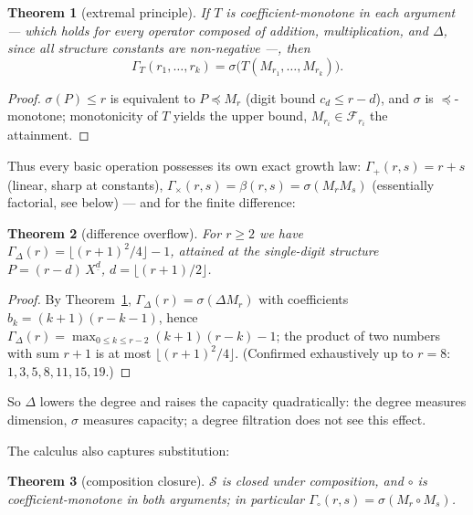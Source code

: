 \documentclass[11pt]{article}
\newtheorem{satz}{Theorem}[section]
\theoremstyle{definition}
\theoremstyle{remark}
\newcommand{\Struk}{\mathcal S}
\newcommand{\ff}[2]{#1^{\underline{#2}}}
\begin{document}
\begin{satz}[extremal principle]\label{satz:extremal}
If $T$ is coefficient-monotone in each argument --- which holds for
every operator composed of addition, multiplication, and $\Delta$,
since all structure constants are non-negative ---, then
\[
\Gamma_T(r_1,\ldots,r_k)=\sigma\bigl(T(M_{r_1},\ldots,M_{r_k})\bigr).
\]
\end{satz}

\begin{proof}
$\sigma(P)\le r$ is equivalent to $P\preceq M_r$ (digit bound
$c_d\le r-d$), and $\sigma$ is $\preceq$-monotone; monotonicity of
$T$ yields the upper bound, $M_{r_i}\in\mathcal F_{r_i}$ the
attainment.
\end{proof}

Thus every basic operation possesses its own exact growth law:
$\Gamma_+(r,s)=r+s$ (linear, sharp at constants),
$\Gamma_\times(r,s)=\beta(r,s)=\sigma(M_rM_s)$ (essentially
factorial, see below) --- and for the finite difference:

\begin{satz}[difference overflow]\label{satz:differenzueberlauf}
For $r\ge2$ we have
$\Gamma_\Delta(r)=\lfloor(r+1)^2/4\rfloor-1$, attained at the
single-digit structure $P=(r{-}d)\,\ff Xd$, $d=\lfloor(r+1)/2\rfloor$.
\end{satz}

\begin{proof}
By Theorem~\ref{satz:extremal},
$\Gamma_\Delta(r)=\sigma(\Delta M_r)$ with coefficients
$b_k=(k{+}1)(r{-}k{-}1)$, hence
$\Gamma_\Delta(r)=\max_{0\le k\le r-2}(k{+}1)(r{-}k)-1$; the
product of two numbers with sum $r{+}1$ is at most
$\lfloor(r{+}1)^2/4\rfloor$. (Confirmed exhaustively up to $r=8$:
$1,3,5,8,11,15,19$.)
\end{proof}

So $\Delta$ lowers the degree and raises the capacity
quadratically: the degree measures dimension, $\sigma$ measures
capacity; a degree filtration does not see this effect.

The calculus also captures substitution:

\begin{satz}[composition closure]\label{satz:komposition}
$\Struk$ is closed under composition, and $\circ$ is
coefficient-monotone in both arguments; in particular
$\Gamma_\circ(r,s)=\sigma(M_r\circ M_s)$.
\end{satz}
\end{document}
